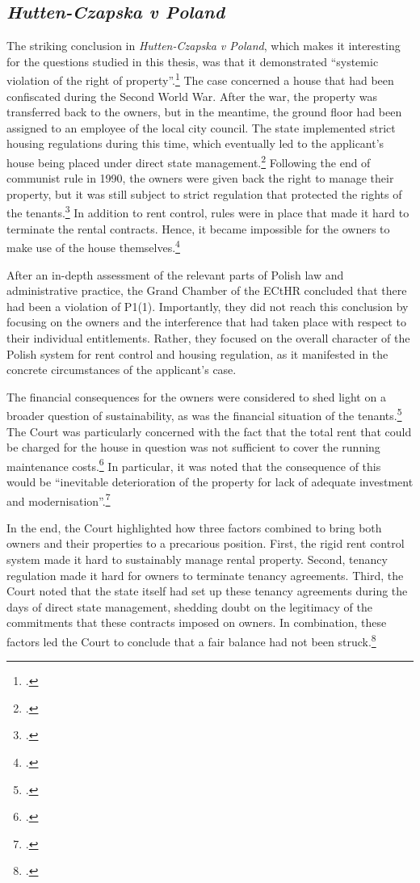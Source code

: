 \subsection{{\it Hutten-Czapska v Poland}}

The striking conclusion in {\it Hutten-Czapska v Poland}, which makes it interesting for the questions studied in this thesis, was that it demonstrated ``systemic violation of the right of property''.\footcite[239]{hutten06} The case concerned a house that had been confiscated during the Second World War. After the war, the property was transferred back to the owners, but in the meantime, the ground floor had been assigned to an employee of the local city council. The state implemented strict housing regulations during this time, which eventually led to the applicant's house being placed under direct state management.\footcite[20-31]{hutten06} Following the end of communist rule in 1990, the owners were given back the right to manage their property, but it was still subject to strict regulation that protected the rights of the tenants.\footcite[31-53]{hutten06} In addition to rent control, rules were in place that made it hard to terminate the rental contracts. Hence, it became impossible for the owners to make use of the house themselves.\footcite[20-53]{hutten06} 

After an in-depth assessment of the relevant parts of Polish law and administrative practice, the Grand Chamber of the ECtHR concluded that there had been a violation of P1(1). Importantly, they did not reach this conclusion by focusing on the owners and the interference that had taken place with respect to their individual entitlements. Rather, they focused on the overall character of the Polish system for rent control and housing regulation, as it manifested in the concrete circumstances of the applicant's case.

The financial consequences for the owners were considered to shed light on a broader question of sustainability, as was the financial situation of the tenants.\footcite[60-61]{hutten06} The Court was particularly concerned with the fact that the total rent that could be charged for the house in question was not sufficient to cover the running maintenance costs.\footcite[224]{hutten06} In particular, it was noted that the consequence of this would be ``inevitable deterioration of the property for lack of adequate investment and modernisation''.\footnote{\cite[224]{hutten06}.}

In the end, the Court highlighted how three factors combined to bring both owners and their properties  to a precarious position. First, the rigid rent control system made it hard to sustainably manage rental property. Second, tenancy regulation made it hard for owners to terminate tenancy agreements. Third, the Court noted that the state itself had set up these tenancy agreements during the days of direct state management, shedding doubt on the legitimacy of the commitments that these contracts imposed on owners. In combination, these factors led the Court to conclude that  a fair balance had not been struck.\footcite[224-225]{hutten06} 


